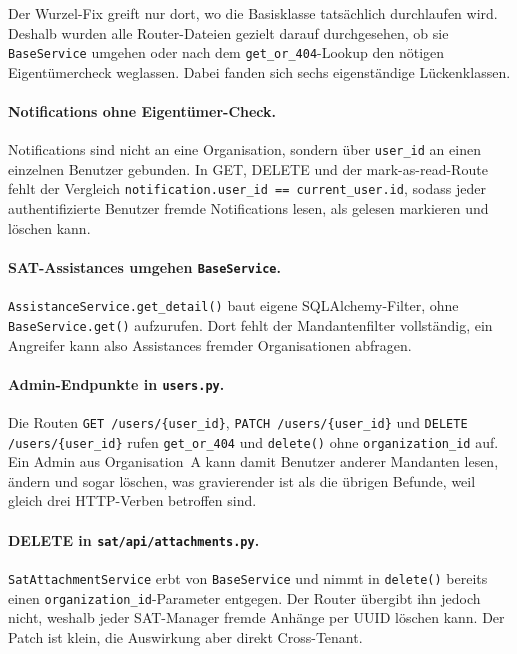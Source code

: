Der Wurzel-Fix greift nur dort, wo die Basisklasse tatsächlich
durchlaufen wird. Deshalb wurden alle Router-Dateien gezielt darauf
durchgesehen, ob sie \texttt{BaseService} umgehen oder nach dem
\texttt{get\_or\_404}-Lookup den nötigen Eigentümercheck weglassen.
Dabei fanden sich sechs eigenständige Lückenklassen.

\paragraph{Notifications ohne Eigentümer-Check.}
Notifications sind nicht an eine Organisation, sondern über
\texttt{user\_id} an einen einzelnen Benutzer gebunden. In GET, DELETE
und der mark-as-read-Route fehlt der Vergleich
\texttt{notification.user\_id == current\_user.id}, sodass jeder
authentifizierte Benutzer fremde Notifications lesen, als gelesen
markieren und löschen kann.

\paragraph{SAT-Assistances umgehen \texttt{BaseService}.}
\texttt{Assistance\allowbreak Service.get\_detail()} baut eigene
SQLAlchemy-Filter, ohne \texttt{BaseService.get()} aufzurufen. Dort
fehlt der Mandantenfilter vollständig, ein Angreifer kann also
Assistances fremder Organisationen abfragen.

\paragraph{Admin-Endpunkte in \texttt{users.py}.}
Die Routen \texttt{GET /users/\{user\_id\}},
\texttt{PATCH /users/\{user\_id\}} und
\texttt{DELETE /users/\{user\_id\}} rufen \texttt{get\_or\_404} und
\texttt{delete()} ohne \texttt{organization\_id} auf. Ein Admin aus
Organisation~A kann damit Benutzer anderer Mandanten lesen, ändern und
sogar löschen, was gravierender ist als die übrigen Befunde, weil
gleich drei HTTP-Verben betroffen sind.

\paragraph{DELETE in \texttt{sat/api/attachments.py}.}
\texttt{SatAttachmentService} erbt von \texttt{BaseService} und nimmt
in \texttt{delete()} bereits einen \texttt{organization\_id}-Parameter
entgegen. Der Router übergibt ihn jedoch nicht, weshalb jeder
SAT-Manager fremde Anhänge per UUID löschen kann. Der Patch ist klein,
die Auswirkung aber direkt Cross-Tenant.

